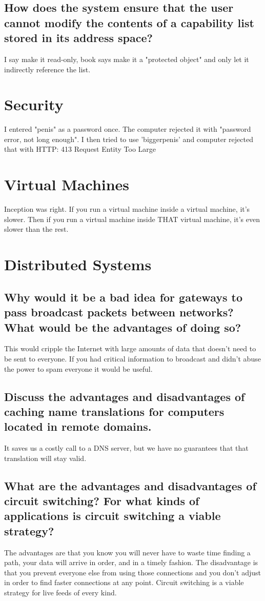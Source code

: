 \documentclass{book}%
\begin{document}
\section{How does the system ensure that the user cannot modify the contents of
a capability list stored in its address space?}
I say make it read-only, book says make it a "protected object" and only let it
indirectly reference the list.
\chapter{Security}
I entered "penis" as a password once. The computer rejected it with "password
error, not long enough". I then tried to use 'biggerpenis' and computer rejected
that with HTTP: 413 Request Entity Too Large
\chapter{Virtual Machines}
Inception was right. If you run a virtual machine inside a virtual machine, it's
slower. Then if you run a virtual machine inside THAT virtual machine, it's even
slower than the rest.
\chapter{Distributed Systems}
\section{Why would it be a bad idea for gateways to pass broadcast packets
between networks? What would be the advantages of doing so?}
This would cripple the Internet with large amounts of data that doesn't need to
be sent to everyone. If you had critical information to broadcast and didn't
abuse the power to spam everyone it would be useful.
\section{Discuss the advantages and disadvantages of caching name translations
for computers located in remote domains.}
It saves us a costly call to a DNS server, but we have no guarantees that that
translation will stay valid.
\section{What are the advantages and disadvantages of circuit switching? For
what kinds of applications is circuit switching a viable strategy?}
The advantages are that you know you will never have to waste time finding a
path, your data will arrive in order, and in a timely fashion. The disadvantage
is that you prevent everyone else from using those connections and you don't
adjust in order to find faster connections at any point.  Circuit switching is
a viable strategy for live feeds of every kind.
\end{document}
